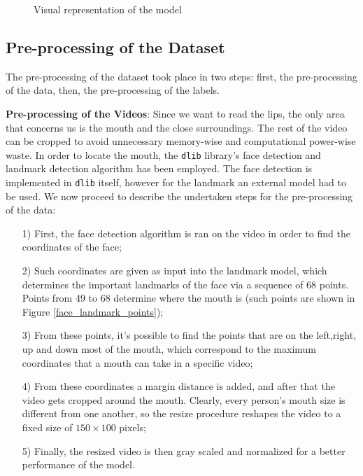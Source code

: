 \documentclass[11pt,journal]{IEEEtran}
\newcommand{\nl}{

\medskip

}
\begin{document}
\begin{figure}
    \renewcommand{\arraystretch}{1.3}
    \caption{Visual representation of the model}
    \label{model_struct}
\end{figure}

\subsection{Pre-processing of the Dataset}

The pre-processing of the dataset took place in two steps: first, the pre-processing of the data, then, the pre-processing of the labels.

\nl
\textbf{Pre-processing of the Videos}: Since we want to read the lips, the only area that concerns us is the mouth and the close surroundings. The rest of the video can be cropped to avoid unnecessary memory-wise and computational power-wise waste. In order to locate the mouth, the \texttt{dlib} \cite{gunileo:dlib} library's face detection and landmark detection algorithm has been employed. The face detection is implemented in \texttt{dlib} itself, however for the landmark an external model had to be used. We now proceed to describe the undertaken steps for the pre-processing of the data:
\begin{itemize}
    \item [1)] First, the face detection algorithm is ran on the video in order to find the coordinates of the face;
    \item [2)] Such coordinates are given as input into the landmark model, which determines the important landmarks of the face via a sequence of 68 points. Points from 49 to 68 determine where the mouth is (such points are shown in Figure \ref{face_landmark_points});
    \item [3)] From these points, it's possible to find the points that are on the left,right, up and down most of the mouth, which correspond to the maximum coordinates that a mouth can take in a specific video;
    \item [4)] From these coordinates a margin distance is added, and after that the video gets cropped around the mouth. Clearly, every person's mouth size is different from one another, so the resize procedure reshapes the video to a fixed size of $150 \times 100$ pixels;
    \item [5)] Finally, the resized video is then gray scaled and normalized for a better performance of the model.
\end{itemize}
\end{document}
